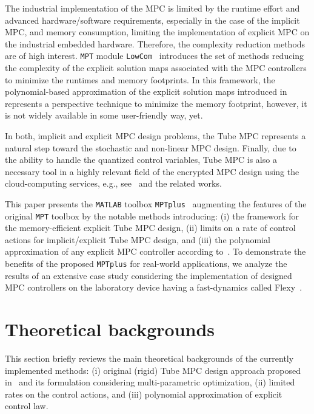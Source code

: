 \documentclass[letterpaper, 10 pt, conference]{ieeeconf}
\begin{document}
	The industrial implementation of the MPC is limited by the runtime effort and advanced hardware/software requirements, especially in the case of the implicit MPC, and memory consumption, limiting the implementation of explicit MPC on the industrial embedded hardware. Therefore, the complexity reduction methods are of high interest. 
	\texttt{MPT} module \texttt{LowCom}~\cite{KH15} introduces the set of methods reducing the complexity of the explicit solution maps associated with the MPC controllers to minimize the runtimes and memory footprints. 
	In this framework, the polynomial-based approximation of the explicit solution maps introduced in~\cite{KL11} represents a perspective technique to minimize the memory footprint, however, it is not widely available in some user-friendly way, yet.
	
	In both, implicit and explicit MPC design problems, the Tube MPC represents a natural step toward the stochastic and non-linear MPC design. Finally, due to the ability to handle the quantized control variables, Tube MPC is also a necessary tool in a highly relevant field of the encrypted MPC design using the cloud-computing services, e.g., see~\cite{DR18} and the related works.
	
	This paper presents the \texttt{MATLAB} toolbox \texttt{MPTplus}~\cite{MPTplus} augmenting the features of the original \texttt{MPT} toolbox by the notable methods introducing: (i) the framework for the memory-efficient explicit Tube MPC design, (ii) limits on a rate of control actions for implicit/explicit Tube MPC design, and (iii) the polynomial approximation of any explicit MPC controller according to~\cite{KL11}. To demonstrate the benefits of the proposed \texttt{MPTplus} for real-world applications, we analyze the results of an extensive case study considering the implementation of designed MPC controllers on the laboratory device having a fast-dynamics called Flexy~\cite{CK19}. 
	
	\section{Theoretical backgrounds}
	\label{sec:tube_mpc_theory}
	
	This section briefly reviews the main theoretical backgrounds of the currently implemented methods: (i) original (rigid) Tube MPC design approach proposed in~\cite{MS05} and its formulation considering multi-parametric optimization, (ii) limited rates on the control actions, and (iii) polynomial approximation of explicit control law.
	
\end{document}

